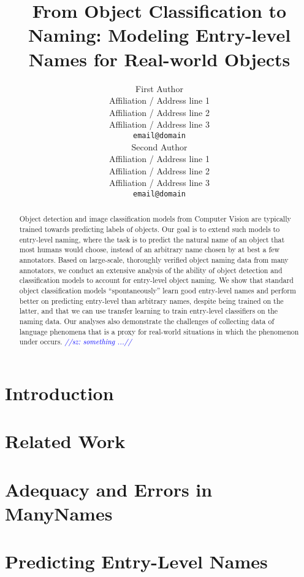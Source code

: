 \documentclass[11pt,a4paper]{article}
\title{From Object Classification to Naming: Modeling Entry-level Names for Real-world Objects}
\author{First Author \\
  Affiliation / Address line 1 \\
  Affiliation / Address line 2 \\
  Affiliation / Address line 3 \\
  \texttt{email@domain} \\\And
  Second Author \\
  Affiliation / Address line 1 \\
  Affiliation / Address line 2 \\
  Affiliation / Address line 3 \\
  \texttt{email@domain} \\}
\date{}
\newcommand{\sz}[1]{\textcolor{blue}{\emph{//sz: #1//}}}
\newcommand{\cs}[1]{\textcolor{green!60!black}{\emph{//cs: #1//}}}
\newcommand{\mn}{ManyNames\xspace}
\newcommand{\arbitrary}{arbitrary\xspace}
\begin{document}
\maketitle
\begin{abstract}
Object detection and image classification models from Computer Vision are typically trained towards predicting labels of objects. 
Our goal is to extend such models to entry-level naming, where the task is to predict the natural name of an object that most humans would choose, instead of an \arbitrary name chosen by at best a few annotators. 
Based on large-scale, thoroughly verified object naming data from many annotators, we conduct an extensive analysis of the ability of object detection and classification models to account for entry-level object naming.
We show that standard object classification models ``spontaneously'' learn good entry-level names and perform better
on predicting entry-level than \arbitrary names, despite being trained on the latter, and that we can use transfer learning to train entry-level classifiers on the naming data. 
Our analyses also demonstrate the challenges of collecting data of language phenomena that is a proxy for real-world situations in which the phenomenon under occurs.  
\sz{something ...}
\end{abstract}

\section{Introduction}
\label{sec:intro}


\section{Related Work}
\label{sec:related}


\section{Adequacy and Errors in ManyNames}
\label{sec:manynames}


\section{Predicting Entry-Level Names}
\label{sec:experiments}

\end{document}
